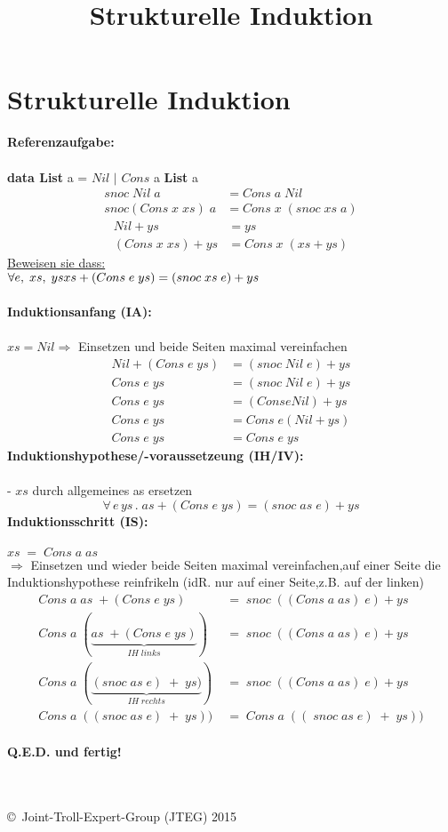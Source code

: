 \documentclass{article}
\title{Strukturelle Induktion}
\date{ }
\begin{document}
	\section*{Strukturelle Induktion}
	\textbf{Referenzaufgabe:} \\
		\\
		\textbf{data List} a = $Nil$ $|$ $Cons$ a \textbf{List} a
		\begin{align*}
			snoc\;Nil\;a 			&= Cons\;a\;Nil\\
			snoc(Cons\;x\;xs)\;a	&= Cons\;x\;(snoc\;xs\;a)
		\end{align*}
		\begin{align*}
			Nil + ys 			&= ys\\
			(Cons\;x\;xs) + ys 	&= Cons\;x\;(xs + ys)
		\end{align*}
		\underline{Beweisen sie dass:}\\
		$\forall e,\;xs,\;ys\\xs+(Cons\;e\;ys) = (snoc\;xs\;e)+ys$ \\\\
	\textbf{Induktionsanfang (IA):}\\\\
		$xs = Nil$\;\;$\Rightarrow$ Einsetzen und beide Seiten maximal vereinfachen
	\begin{align*}
		Nil+(Cons\;e\;ys) 	&= (snoc\;Nil\;e)+ys\\
			 Cons\;e\;ys	&= (snoc\;Nil\;e)+ys\\
			 Cons\;e\;ys	&= (Cons e Nil) + ys\\
			 Cons\;e\;ys	&= Cons\;e (Nil + ys)\\
			 Cons\;e\;ys	&= Cons\;e\;ys
	\end{align*}
	\textbf{Induktionshypothese/-voraussetzeung (IH/IV):}\\\\
	- $xs$ durch allgemeines as ersetzen
	\[\forall\,e\,ys\,.\;as+(Cons\;e\;ys) = (snoc\;as\;e)+ys\]
\newpage
	\textbf{Induktionsschritt (IS):}\\\\
	$xs\;=\;Cons\;a\;as$\\$\Rightarrow$ Einsetzen und wieder beide Seiten maximal vereinfachen,auf einer Seite die Induktionshypothese reinfrikeln (idR. nur auf einer Seite,z.B. auf der linken)
	\begin{align*}
		Cons\;a\;as\;+(Cons\;e\;ys)\;&=\;snoc\;((Cons\;a\;as)\;e)+ys \\
		Cons\;a\;(\underbrace{as\;+(Cons\;e\;ys)}_{IH\;links})\;&=\;snoc\;((Cons\;a\;as)\;e)+ys\\
		Cons\;a\;(\underbrace{(snoc\;as\;e)\;+\;ys)}_{IH\;rechts})\;&=\;snoc\;((Cons\;a\;as)\;e)+ys\\
		Cons\;a\;((snoc\;as\;e)\;+\;ys))\;&=\;Cons\;a\;((\;snoc\;as\;e)\;+\;ys))
	\end{align*}\\
\textbf{Q.E.D. und fertig!}\\
\\\\
	\begin{tiny}
	\copyright\ Joint-Troll-Expert-Group (JTEG) 2015
	\end{tiny}
\end{document}
